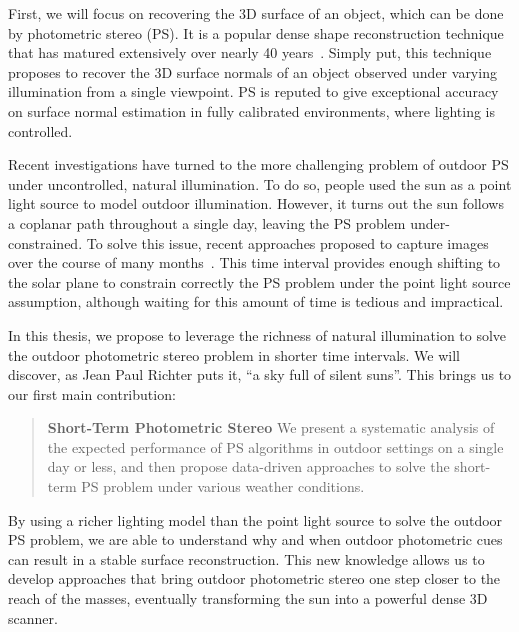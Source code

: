 First, we will focus on recovering the 3D surface of an object, which can be done by photometric stereo (PS). It is a popular dense shape reconstruction technique that has matured extensively over nearly 40 years~\cite{woodham-opteng-80}. %
Simply put, this technique proposes to recover the 3D surface normals of an object observed under varying illumination from a single viewpoint.
PS is reputed to give exceptional accuracy on surface normal estimation in fully calibrated environments, where lighting is controlled.

Recent investigations have turned to the more challenging problem of outdoor PS under uncontrolled, natural illumination. To do so, people used the sun as a point light source to model outdoor illumination. However, it turns out the sun follows a coplanar path throughout a single day, leaving the PS problem under-constrained. To solve this issue, recent approaches proposed to capture images over the course of many months~\cite{ackermann-cvpr-12,abrams-eccv-12}. This time interval provides enough shifting to the solar plane to constrain correctly the PS problem under the point light source assumption, although waiting for this amount of time is tedious and impractical.


In this thesis, we propose to leverage the richness of natural illumination to solve the outdoor photometric stereo problem in shorter time intervals. We will discover, as Jean Paul Richter puts it, ``a sky full of silent suns''. This brings us to our first main contribution:
%
\begin{quotation}
\textbf{Short-Term Photometric Stereo} We present a systematic analysis of the expected performance of PS algorithms in outdoor settings on a single day or less, and then propose data-driven approaches to solve the short-term PS problem under various weather conditions.
\end{quotation}

By using a richer lighting model than the point light source to solve the outdoor PS problem, we are able to understand why and when outdoor photometric cues can result in a stable surface reconstruction. This new knowledge allows us to develop approaches that bring outdoor photometric stereo one step closer to the reach of the masses, eventually transforming the sun into a powerful dense 3D scanner.

